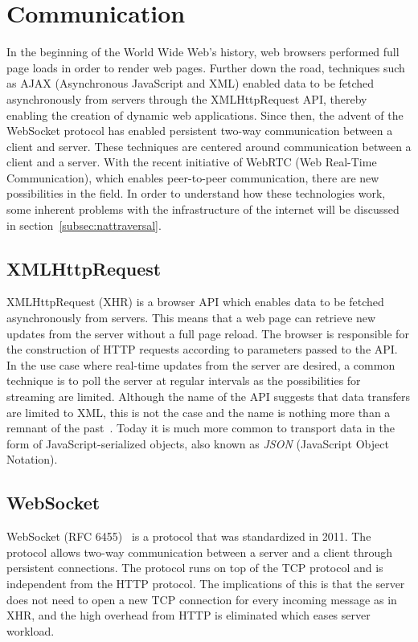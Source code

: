 \section{Communication}
\label{sec:communication}
In the beginning of the World Wide Web's history, web browsers performed full page loads in order to render web pages. Further down the road, techniques such as AJAX (Asynchronous JavaScript and XML) enabled data to be fetched asynchronously from servers through the XMLHttpRequest API, thereby enabling the creation of dynamic web applications. Since then, the advent of the WebSocket protocol has enabled persistent two-way communication between a client and server. These techniques are centered around communication between a client and a server. With the recent initiative of WebRTC (Web Real-Time Communication), which enables peer-to-peer communication, there are new possibilities in the field. In order to understand how these technologies work, some inherent problems with the infrastructure of the internet will be discussed in section~\ref{subsec:nattraversal}.

\subsection{XMLHttpRequest}
XMLHttpRequest (XHR) is a browser API which enables data to be fetched asynchronously from servers. This means that a web page can retrieve new updates from the server without a full page reload. The browser is responsible for the construction of HTTP requests according to parameters passed to the API. In the use case where real-time updates from the server are desired, a common technique is to poll the server at regular intervals as the possibilities for streaming are limited. Although the name of the API suggests that data transfers are limited to XML, this is not the case and the name is nothing more than a remnant of the past~\cite{XHR:Online}. Today it is much more common to transport data in the form of JavaScript-serialized objects, also known as \emph{JSON} (JavaScript Object Notation).

\subsection{WebSocket}
WebSocket (RFC 6455)~\cite{RFC6455:Online} is a protocol that was standardized in 2011. The protocol allows two-way communication between a server and a client through persistent connections. The protocol runs on top of the TCP protocol and is independent from the HTTP protocol. The implications of this is that the server does not need to open a new TCP connection for every incoming message as in XHR, and the high overhead from HTTP is eliminated which eases server workload.

